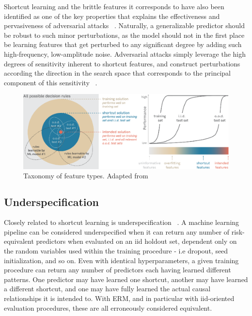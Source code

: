 	Shortcut learning and the brittle features it corresponds to have also been identified as one of the key properties that explains the effectiveness and pervasiveness of adversarial attacks ~\cite{adversarial_bugs_features}. Naturally, a generalizable predictor should be robust to such minor perturbations, as the model should not in the first place be learning features that get perturbed to any significant degree by adding such high-frequency, low-amplitude noise. Adversarial attacks simply leverage the high degrees of sensitivity inherent to shortcut features, and construct perturbations according the direction in the search space that corresponds to the principal component of this sensitivity ~\cite{sensitivity}. 

	\begin{figure}[ht]
		\includegraphics[width=\linewidth]{illustrations/features.png}
		\caption{Taxonomy of feature types. Adapted from ~\cite{shortcut_learning}}
		\label{feature_types}
	\end{figure}


	\subsection{Underspecification}
	Closely related to shortcut learning is underspecification ~\cite{damour2020underspecification}. A machine learning pipeline can be considered underspecified when it can return any number of risk-equivalent predictors when evaluated on an iid holdout set, dependent only on the random variables used within the training procedure - i.e dropout, seed initialization, and so on. Even with identical hyperparameters, a given training procedure can return any number of predictors each having learned different patterns. One predictor may have learned one shortcut, another may have learned a different shortcut, and one may have fully learned the actual causal relationships it is intended to. With ERM, and in particular with iid-oriented evaluation procedures, these are all erroneously considered equivalent. 

